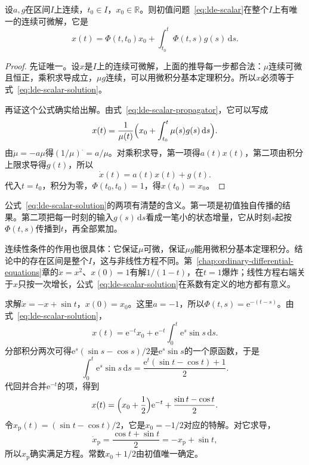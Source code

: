 \begin{theorem}[连续系数的一阶线性方程]
\label{thm:lde-scalar-solution}
设$a,g$在区间$I$上连续，$t_0\in I$，$x_0\in\mathbb{R}$。则初值问题~\eqref{eq:lde-scalar}在整个$I$上有唯一的连续可微解，它是
\begin{equation}
 x(t)=\Phi(t,t_0)x_0+\int_{t_0}^{t}\Phi(t,s)g(s)\,\mathrm{d}s.
 \label{eq:lde-scalar-solution}
\end{equation}
\end{theorem}

\begin{proof}
先证唯一。设$x$是$I$上的连续可微解，上面的推导每一步都合法：$\mu$连续可微且恒正，乘积求导成立，$\mu g$连续，可以用微积分基本定理积分。所以$x$必须等于式~\eqref{eq:lde-scalar-solution}。

再证这个公式确实给出解。由式~\eqref{eq:lde-scalar-propagator}，它可以写成
\[
 x(t)=\frac{1}{\mu(t)}\Bigl(x_0+\int_{t_0}^{t}\mu(s)g(s)\,\mathrm{d}s\Bigr).
\]
由$\dot{\mu}=-a\mu$得$(1/\mu)^{\cdot}=a/\mu$。对乘积求导，第一项得$a(t)x(t)$，第二项由积分上限求导得$g(t)$，所以
\[
 \dot{x}(t)=a(t)x(t)+g(t).
\]
代入$t=t_0$，积分为零，$\Phi(t_0,t_0)=1$，得$x(t_0)=x_0$。
\end{proof}

公式~\eqref{eq:lde-scalar-solution}的两项有清楚的含义。第一项是初值独自传播的结果。第二项把每一时刻的输入$g(s)\,\mathrm{d}s$看成一笔小的状态增量，它从时刻$s$起按$\Phi(t,s)$传播到$t$，再全部累加。

连续性条件的作用也很具体：它保证$\mu$可微，保证$\mu g$能用微积分基本定理积分。结论中的存在区间是整个$I$，这与非线性方程不同。第~\ref{chap:ordinary-differential-equations}章的$\dot{x}=x^2$、$x(0)=1$有解$1/(1-t)$，在$t=1$爆炸；线性方程右端关于$x$只按一次增长，公式~\eqref{eq:lde-scalar-solution}在系数有定义的地方都有意义。

\begin{example}[正弦输入的散热]
\label{ex:lde-sine-input}
求解$\dot{x}=-x+\sin t$，$x(0)=x_0$。这里$a=-1$，所以$\Phi(t,s)=\mathrm{e}^{-(t-s)}$。由式~\eqref{eq:lde-scalar-solution}，
\[
 x(t)=\mathrm{e}^{-t}x_0+\mathrm{e}^{-t}\int_0^t\mathrm{e}^{s}\sin s\,\mathrm{d}s.
\]
分部积分两次可得$\mathrm{e}^{s}(\sin s-\cos s)/2$是$\mathrm{e}^{s}\sin s$的一个原函数，于是
\[
 \int_0^t\mathrm{e}^{s}\sin s\,\mathrm{d}s=\frac{\mathrm{e}^{t}(\sin t-\cos t)+1}{2}.
\]
代回并合并$\mathrm{e}^{-t}$的项，得到
\[
 x(t)=\Bigl(x_0+\frac12\Bigr)\mathrm{e}^{-t}+\frac{\sin t-\cos t}{2}.
\]
令$x_{\mathrm{p}}(t)=(\sin t-\cos t)/2$，它是$x_0=-1/2$对应的特解。对它求导，
\[
 \dot{x}_{\mathrm{p}}=\frac{\cos t+\sin t}{2}=-x_{\mathrm{p}}+\sin t,
\]
所以$x_{\mathrm{p}}$确实满足方程。常数$x_0+1/2$由初值唯一确定。
\end{example}

